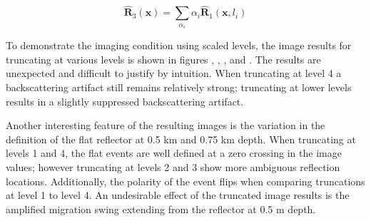 \begin{equation} \label{eqn:cic_ws}
\hat{\mathbf{R}}_3(\mathbf{x})
=\sum_{\alpha_i} {\alpha_i \hat{{\mathbf{R}}}_1(\mathbf{x},l_i)}
\end{equation}

To demonstrate the imaging condition using scaled levels, the image results for truncating at various levels is shown in figures , , , and .  The results are unexpected and difficult to justify by intuition.  When truncating at level 4 a backscattering artifact still remains relatively strong; truncating at lower levels results in a slightly suppressed backscattering artifact.  

Another interesting feature of the resulting images is the variation in the definition of the flat reflector at 0.5 km and 0.75 km depth.  When truncating at levels 1 and 4, the flat events are well defined at a zero crossing in the image values; however truncating at levels 2 and 3 show more ambiguous reflection locations.  Additionally, the polarity of the event flips when comparing truncations at level 1 to level 4.  An undesirable effect of the truncated image results is the amplified migration swing extending from the reflector at 0.5 m depth.











